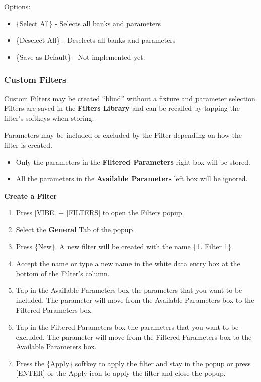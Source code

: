 \documentclass[
]{article}
\begin{document}
Options:

\begin{itemize}
\item
  \{Select All\} - Selects all banks and parameters
\item
  \{Deselect All\} - Deselects all banks and parameters
\item
  \{Save as Default\} - {Not implemented yet.}
\end{itemize}

\hypertarget{custom-filters}{%
\subsubsection{Custom Filters}\label{custom-filters}}

Custom Filters may be created ``blind'' without a fixture and parameter selection.
Filters are saved in the \textbf{Filters Library} and can be recalled by tapping the filter's softkeys when storing.

Parameters may be included or excluded by the Filter depending on how the filter is created.

\begin{itemize}
\item
  Only the parameters in the \textbf{Filtered Parameters} right box will be stored.
\item
  All the parameters in the \textbf{Available Parameters} left box will be ignored.
\end{itemize}

\textbf{Create a Filter}

\begin{enumerate}
\def\labelenumi{\arabic{enumi}.}
\item
  Press {[}VIBE{]} + {[}FILTERS{]} to open the Filters popup.
\item
  Select the \textbf{General} Tab of the popup.
\item
  Press \{New\}. A new filter will be created with the name \{1. Filter 1\}.
\item
  Accept the name or type a new name in the white data entry box at the bottom of the Filter's column.
\item
  Tap in the Available Parameters box the parameters that you want to be included. The parameter will move from the Available Parameters box to the Filtered Parameters box.
\item
  Tap in the Filtered Parameters box the parameters that you want to be excluded. The parameter will move from the Filtered Parameters box to the Available Parameters box.
\item
  Press the \{Apply\} softkey to apply the filter and stay in the popup or press {[}ENTER{]} or the Apply icon to apply the filter and close the popup.
\end{enumerate}
\end{document}
